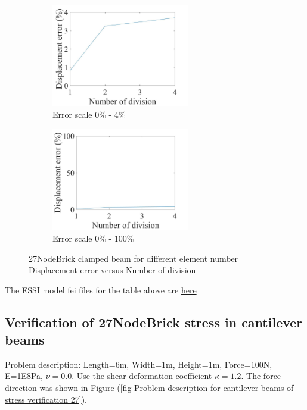 \documentclass[fleqn,11pt]{article}
\begin{document}
\begin{figure}[H]
  \begin{subfigure}{0.5\textwidth}
    \centering
    \includegraphics[width=6cm]{../Figure-files/error27brick_clamped_beam_diff_element.jpeg}
    \caption{Error scale 0\% - 4\%}
  \end{subfigure}
  \begin{subfigure}{0.5\textwidth}
    \centering
    \includegraphics[width=6cm]{../Figure-files/error27brick_clamped_beam_diff_element100.jpeg}
    \caption{Error scale 0\% - 100\%}
  \end{subfigure}
  \captionsetup{justification=centering,margin=3cm}
  \caption{27NodeBrick clamped beam for different element number\\
      Displacement error   versus   Number of division}
  \label{fig error 27NodeBrick clamped beam for different element number}
\end{figure}


The ESSI model fei files for the table above are \href{https://github.com/yuan-energy/ESSI_Verification/blob/master/27NodeBrick/clamped_beam_cut/clamped_beam_cut.tar.gz?raw=true}{here}

\newpage
\subsection{Verification of 27NodeBrick stress in cantilever beams}





Problem description: Length=6m, Width=1m, Height=1m, Force=100N, E=1E8Pa, $\nu=0.0$. Use the shear deformation coefficient $\kappa=1.2$. The force direction was shown in Figure (\ref{fig Problem description for cantilever beams of stress verification 27}). 
\end{document}
